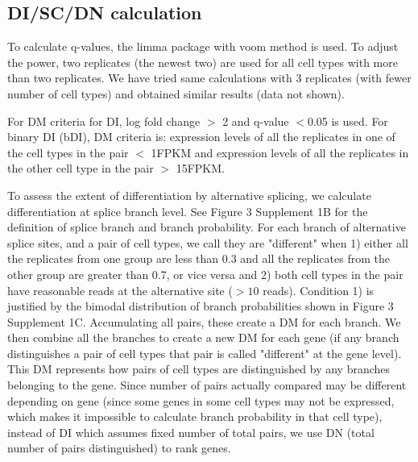 \subsection{DI/SC/DN calculation}
To calculate q-values, the limma package with voom method \citep{Law_2014} is used. To adjust the power, two replicates (the newest two) are used for all cell types with more than two replicates. We have tried same calculations with 3 replicates (with fewer number of cell types) and obtained similar results (data not shown). 

For DM criteria for DI, log fold change $>$ 2 and q-value $<$0.05 is used. For binary DI (bDI), DM criteria is: expression levels of all the replicates in one of the cell types in the pair $<$ 1FPKM and expression levels of all the replicates in the other cell type in the pair $>$ 15FPKM. 

To assess the extent of differentiation by alternative splicing, we calculate differentiation at splice branch level. See Figure 3 Supplement 1B for the definition of splice branch and branch probability. For each branch of alternative splice sites, and a pair of cell types, we call they are "different" when 1) either all the replicates from one group are less than 0.3 and all the replicates from the other group are greater than 0.7, or vice versa and 2) both cell types in the pair have reasonable reads at the alternative site ($>10$ reads). Condition 1) is justified by the bimodal distribution of branch probabilities shown in Figure 3 Supplement 1C. Accumulating all pairs, these create a DM for each branch. We then combine all the branches to create a new DM for each gene (if any branch distinguishes a pair of cell types that pair is called "different" at the gene level). This DM represents how pairs of cell types are distinguished by any branches belonging to the gene. Since number of pairs actually compared may be different depending on gene (since some genes in some cell types may not be expressed, which makes it impossible to calculate branch probability in that cell type), instead of DI which assumes fixed number of total pairs, we use DN (total number of pairs distinguished) to rank genes.

